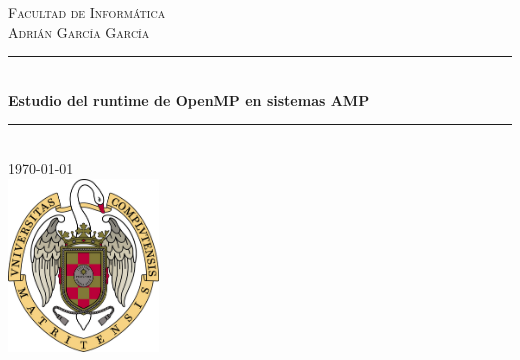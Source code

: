 \renewcommand\indexname{Índice}
\begin{titlepage}

\newcommand{\HRule}{\rule{\linewidth}{0.5mm}} %

\center %
 

\textsc{\LARGE Facultad de Informática}\\[1.5cm] %
\textsc{\large Adrián García García}\\[0.5cm] %


\HRule \\[0.4cm]
{ \huge \bfseries Estudio del runtime de OpenMP en sistemas AMP}\\[0.4cm] %
\HRule \\[1.5cm]
 




{\large \today}\\[2cm] %


\includegraphics[width=4cm,keepaspectratio]{logo.png}
 

\end{titlepage}
